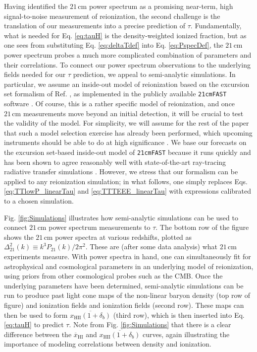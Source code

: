 \documentclass[twocolumn,aps,prd,nofootinbib,showpacs,superscriptaddress]{revtex4-1}
\begin{document}
Having identified the $21\,\textrm{cm}$ power spectrum as a promising near-term, high signal-to-noise measurement of reionization, the second challenge is the translation of our measurements into a precise prediction of $\tau$. Fundamentally, what is needed for Eq. \eqref{eq:tauH} is the density-weighted ionized fraction, but as one sees from substituting Eq. \eqref{eq:deltaTdef} into Eq. \eqref{eq:PspecDef}, the $21\,\textrm{cm}$ power spectrum probes a much more complicated combination of parameters and their correlations. To connect our power spectrum observations to the underlying fields needed for our $\tau$ prediction, we appeal to semi-analytic simulations. In particular, we assume an inside-out model of reionization based on the excursion set formalism of Ref. \cite{furlanetto_et_al2004}, as implemented in the publicly available {\tt 21cmFAST} software \cite{mesinger_et_al2011}. Of course, this is a rather specific model of reionization, and once $21\,\textrm{cm}$ measurements move beyond an initial detection, it will be crucial to test the validity of the model. For simplicity, we will assume for the rest of the paper that such a model selection exercise has already been performed, which upcoming instruments should be able to do at high significance \cite{watkinson_and_pritchard2014}. We base our forecasts on the excursion set-based inside-out model of {\tt 21cmFAST} because it runs quickly and has been shown to agree reasonably well with state-of-the-art ray-tracing radiative transfer simulations \cite{zahn_et_al2011}. However, we stress that our formalism can be applied to any reionization simulation; in what follows, one simply replaces Eqs. \eqref{eq:TTlowP_linearTau} and \eqref{eq:TTTEEE_linearTau} with expressions calibrated to a chosen simulation.

Fig. \ref{fig:Simulations} illustrates how semi-analytic simulations can be used to connect $21\,\textrm{cm}$ power spectrum measurements to $\tau$. The bottom row of the figure shows the $21\,\textrm{cm}$ power spectra at various redshifts, plotted as $\Delta^2_{21} (k) \equiv k^3 P_{21}(k) / 2 \pi^2$. These are (after some data analysis) what $21\,\textrm{cm}$ experiments measure. With power spectra in hand, one can simultaneously fit for astrophysical and cosmological parameters in an underlying model of reionization, using priors from other cosmological probes such as the CMB. Once the underlying parameters have been determined, semi-analytic simulations can be run to produce past light cone maps of the non-linear baryon density (top row of figure) and ionization fields and ionization fields (second row). These maps can then be used to form $\overline{x_\textrm{HII} (1+ \delta_b)}$ (third row), which is then inserted into Eq. \eqref{eq:tauH} to predict $\tau$. Note from Fig. \ref{fig:Simulations} that there is a clear difference between the $\overline{x}_\textrm{HI}$ and $\overline{x_\textrm{HII} (1+ \delta_b)}$ curves, again illustrating the importance of modeling correlations between density and ionization.
\end{document}
